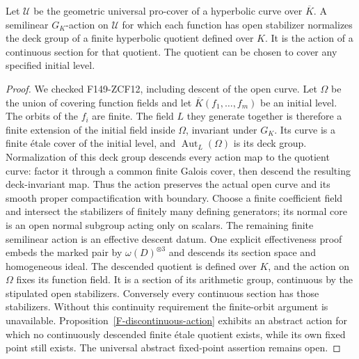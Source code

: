 \begin{proposition}
\label{F-continuous-action}
Let $\mathcal U$ be the geometric universal pro-cover of a hyperbolic
curve over $\overline K$. A semilinear $G_K$-action on $\mathcal U$
for which each function has open stabilizer normalizes the deck
group of a finite hyperbolic quotient defined over $K$. It is the
action of a continuous section for that quotient. The quotient can
be chosen to cover any specified initial level.
\end{proposition}
\begin{proof}
We checked F149-ZCF12, including descent of the open curve. Let
$\Omega$ be the union of covering function fields and let
$\overline K(f_1,\ldots,f_m)$ be an initial level. The orbits of
the $f_i$ are finite. The field $L$ they generate together is
therefore a finite extension of the initial field inside $\Omega$,
invariant under $G_K$. Its curve is a finite \'etale cover of the
initial level, and $\operatorname{Aut}_L(\Omega)$ is its deck group.
Normalization of this deck group descends every action map to
the quotient curve: factor it through a common finite Galois
cover, then descend the resulting deck-invariant map. Thus the
action preserves the actual open curve and its smooth proper
compactification with boundary. Choose a finite coefficient field
and intersect the stabilizers of finitely many defining generators;
its normal core is an open normal subgroup acting only on scalars.
The remaining finite semilinear action is an effective descent
datum. One explicit effectiveness proof embeds the marked pair
by $\omega(D)^{\otimes3}$ and descends its section space and
homogeneous ideal. The descended quotient is defined over $K$,
and the action on $\Omega$ fixes its function field. It is a
section of its arithmetic group, continuous by the stipulated
open stabilizers. Conversely every continuous section has those
stabilizers. Without this continuity requirement the finite-orbit
argument is unavailable. Proposition~\ref{F-discontinuous-action}
exhibits an abstract action for which no continuously descended
finite \'etale quotient exists, while its own fixed point still
exists. The universal abstract fixed-point assertion remains open.
\end{proof}


